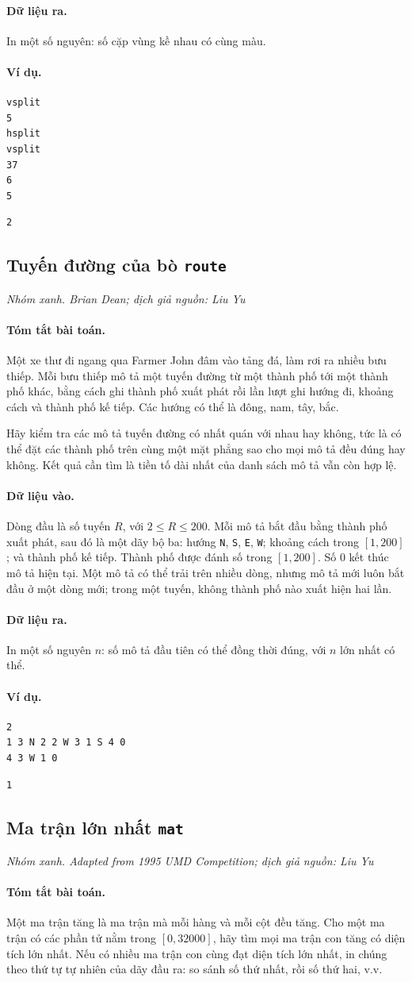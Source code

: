 \documentclass[11pt]{article}
\newcommand{\problem}[4]{%
  \subsection[#1 (#2)]{#1 \hfill {\normalsize\texttt{#2}}}%
  \noindent\textit{#3. #4}\par\smallskip
}
\newcommand{\iosec}[1]{\paragraph{#1}}
\begin{document}
\iosec{Dữ liệu ra.}
In một số nguyên: số cặp vùng kề nhau có cùng màu.

\iosec{Ví dụ.}
\begin{verbatim}
vsplit
5
hsplit
vsplit
37
6
5
\end{verbatim}

\begin{verbatim}
2
\end{verbatim}

\problem{Tuyến đường của bò}{route}{Nhóm xanh}{Brian Dean; dịch giả nguồn: Liu Yu}

\iosec{Tóm tắt bài toán.}
Một xe thư đi ngang qua Farmer John đâm vào tảng đá, làm rơi ra nhiều bưu
thiếp. Mỗi bưu thiếp mô tả một tuyến đường từ một thành phố tới một thành phố
khác, bằng cách ghi thành phố xuất phát rồi lần lượt ghi hướng đi, khoảng cách
và thành phố kế tiếp. Các hướng có thể là đông, nam, tây, bắc.

Hãy kiểm tra các mô tả tuyến đường có nhất quán với nhau hay không, tức là có
thể đặt các thành phố trên cùng một mặt phẳng sao cho mọi mô tả đều đúng hay
không. Kết quả cần tìm là tiền tố dài nhất của danh sách mô tả vẫn còn hợp lệ.

\iosec{Dữ liệu vào.}
Dòng đầu là số tuyến \(R\), với \(2\le R\le 200\). Mỗi mô tả bắt đầu bằng thành
phố xuất phát, sau đó là một dãy bộ ba: hướng \texttt{N}, \texttt{S},
\texttt{E}, \texttt{W}; khoảng cách trong \([1,200]\); và thành phố kế tiếp.
Thành phố được đánh số trong \([1,200]\). Số \(0\) kết thúc mô tả hiện tại.
Một mô tả có thể trải trên nhiều dòng, nhưng mô tả mới luôn bắt đầu ở một dòng
mới; trong một tuyến, không thành phố nào xuất hiện hai lần.

\iosec{Dữ liệu ra.}
In một số nguyên \(n\): số mô tả đầu tiên có thể đồng thời đúng, với \(n\) lớn
nhất có thể.

\iosec{Ví dụ.}
\begin{verbatim}
2
1 3 N 2 2 W 3 1 S 4 0
4 3 W 1 0
\end{verbatim}

\begin{verbatim}
1
\end{verbatim}

\problem{Ma trận lớn nhất}{mat}{Nhóm xanh}{Adapted from 1995 UMD Competition; dịch giả nguồn: Liu Yu}

\iosec{Tóm tắt bài toán.}
Một ma trận tăng là ma trận mà mỗi hàng và mỗi cột đều tăng. Cho một ma trận
có các phần tử nằm trong \([0,32000]\), hãy tìm mọi ma trận con tăng có diện
tích lớn nhất. Nếu có nhiều ma trận con cùng đạt diện tích lớn nhất, in chúng
theo thứ tự tự nhiên của dãy đầu ra: so sánh số thứ nhất, rồi số thứ hai, v.v.
\end{document}
